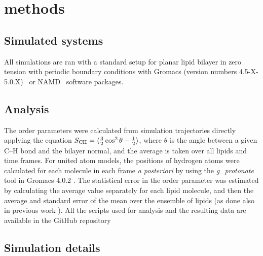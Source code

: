 \documentclass[twoside,twocolumn,9pt]{article}
\begin{document}
\section{methods}

\subsection{Simulated systems}
All simulations are ran with a standard setup for planar lipid bilayer in zero tension
with periodic boundary conditions with Gromacs (version numbers 4.5-X-5.0.X)~\cite{pronk13,abraham15} 
or NAMD~\cite{NAMD} software packages.

\subsection{Analysis}
The order parameters were calculated from simulation trajectories directly applying the equation
$S_{{\rm CH}}=\langle \frac{3}{2}  \cos^2 \theta-\frac{1}{2} \rangle$,
where $\theta$ is the angle between a given C--H bond and the bilayer normal, and the average is taken
over all lipids and time frames. For united atom models, the positions of hydrogen atoms
were calculated for each molecule in each frame \textit{a posteriori} by using the {\it g\_protonate} tool in 
Gromacs 4.0.2 \cite{gromacsMANUAL402}. 
The statistical error in the order parameter was estimated by calculating the average value separately for each lipid molecule,
and then the average and standard error of the mean over the ensemble of lipids (as done also in previous work \cite{botan15}).
All the scripts used for analysis and the resulting data are available in the GitHub repository \cite{githubIONpaper}

\subsection{Simulation details}
\end{document}
